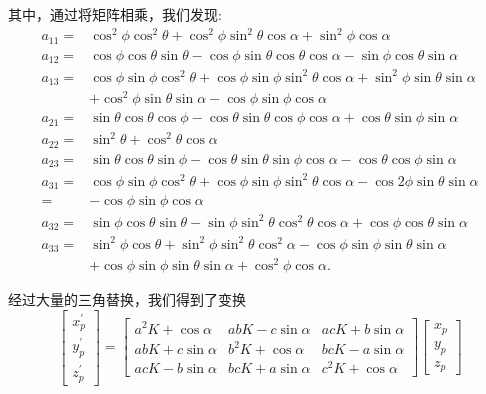 其中，通过将矩阵相乘，我们发现:
$$
\begin{aligned}
a_{11}= & \cos ^{2} \phi \cos ^{2} \theta+\cos ^{2} \phi \sin ^{2} \theta \cos \alpha+\sin ^{2} \phi \cos \alpha \\
a_{12}= & \cos \phi \cos \theta \sin \theta-\cos \phi \sin \theta \cos \theta \cos \alpha-\sin \phi \cos \theta \sin \alpha \\
a_{13}= & \cos \phi \sin \phi \cos ^{2} \theta+\cos \phi \sin \phi \sin ^{2} \theta \cos \alpha+\sin ^{2} \phi \sin \theta \sin \alpha \\
& +\cos ^{2} \phi \sin \theta \sin \alpha-\cos \phi \sin \phi \cos \alpha \\
a_{21}= & \sin \theta \cos \theta \cos \phi-\cos \theta \sin \theta \cos \phi \cos \alpha+\cos \theta \sin \phi \sin \alpha \\
a_{22}= & \sin ^{2} \theta+\cos ^{2} \theta \cos \alpha \\
a_{23}= & \sin \theta \cos \theta \sin \phi-\cos \theta \sin \theta \sin \phi \cos \alpha-\cos \theta \cos \phi \sin \alpha \\
a_{31}= & \cos \phi \sin \phi \cos ^{2} \theta+\cos \phi \sin \phi \sin ^{2} \theta \cos \alpha-\cos 2 \phi \sin \theta \sin \alpha \\
= & -\cos \phi \sin \phi \cos \alpha \\
a_{32}= & \sin \phi \cos \theta \sin \theta-\sin \phi \sin ^{2} \theta \cos ^{2} \theta \cos \alpha+\cos \phi \cos \theta \sin \alpha \\
a_{33}= & \sin ^{2} \phi \cos \theta+\sin ^{2} \phi \sin ^{2} \theta \cos ^{2} \alpha-\cos \phi \sin \phi \sin \theta \sin \alpha \\
& +\cos \phi \sin \phi \sin \theta \sin \alpha+\cos ^{2} \phi \cos \alpha .
\end{aligned}
$$

经过大量的三角替换，我们得到了变换
$$
\left[\begin{array}{c}
x_{p}^{\prime} \\
y_{p}^{\prime} \\
z_{p}^{\prime}
\end{array}\right]=\left[\begin{array}{ccc}
a^{2} K+\cos \alpha & a b K-c \sin \alpha & a c K+b \sin \alpha \\
a b K+c \sin \alpha & b^{2} K+\cos \alpha & b c K-a \sin \alpha \\
a c K-b \sin \alpha & b c K+a \sin \alpha & c^{2} K+\cos \alpha
\end{array}\right]\left[\begin{array}{l}
x_{p} \\
y_{p} \\
z_{p}
\end{array}\right]
$$


